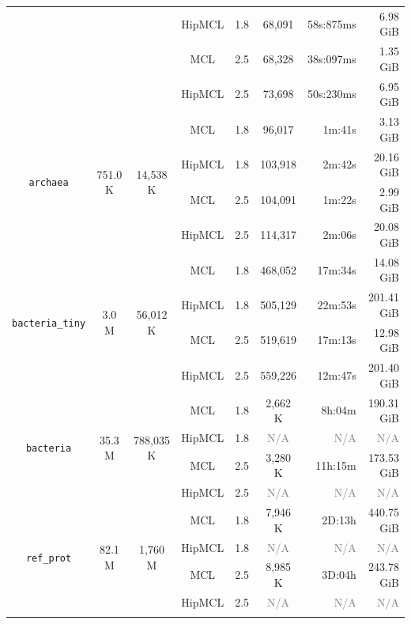 \begin{table}[htbp]
\begin{tabular}{ccccccrr}
    & & & HipMCL & 1.8 & 68,091 & 58s:875ms & 6.98 GiB \\
    & & & MCL    & 2.5 & 68,328 & 38s:097ms & 1.35 GiB \\
    & & & HipMCL & 2.5 & 73,698 & 50s:230ms & 6.95 GiB \\
    \midrule
    \multirow{4}{*}{\texttt{archaea}} & \multirow{4}{*}{751.0 K} & \multirow{4}{*}{14,538 K}
        & MCL    & 1.8 &  96,017 & 1m:41s &  3.13 GiB \\
    & & & HipMCL & 1.8 & 103,918 & 2m:42s & 20.16 GiB \\
    & & & MCL    & 2.5 & 104,091 & 1m:22s &  2.99 GiB \\
    & & & HipMCL & 2.5 & 114,317 & 2m:06s & 20.08 GiB \\
    \midrule
    \multirow{4}{*}{\texttt{bacteria\_tiny}} & \multirow{4}{*}{3.0 M} & \multirow{4}{*}{56,012 K}
        & MCL    & 1.8 & 468,052 & 17m:34s &  14.08 GiB \\
    & & & HipMCL & 1.8 & 505,129 & 22m:53s & 201.41 GiB \\
    & & & MCL    & 2.5 & 519,619 & 17m:13s &  12.98 GiB \\
    & & & HipMCL & 2.5 & 559,226 & 12m:47s & 201.40 GiB \\
    \midrule
    \multirow{4}{*}{\texttt{bacteria}} & \multirow{4}{*}{35.3 M} & \multirow{4}{*}{788,035 K}
        & MCL    & 1.8 & 2,662 K & 8h:04m & 190.31 GiB \\
    & & & HipMCL & 1.8 & \textcolor{gray}{N/A} & \textcolor{gray}{N/A} & \textcolor{gray}{N/A} \\
    & & & MCL    & 2.5 & 3,280 K & 11h:15m & 173.53 GiB \\
    & & & HipMCL & 2.5 & \textcolor{gray}{N/A} & \textcolor{gray}{N/A} & \textcolor{gray}{N/A} \\
    \midrule
    \multirow{4}{*}{\texttt{ref\_prot}} & \multirow{4}{*}{82.1 M} & \multirow{4}{*}{1,760 M}
        & MCL    & 1.8 & 7,946 K & 2D:13h & 440.75 GiB \\
    & & & HipMCL & 1.8 & \textcolor{gray}{N/A} & \textcolor{gray}{N/A} & \textcolor{gray}{N/A} \\
    & & & MCL    & 2.5 & 8,985 K & 3D:04h & 243.78 GiB \\
    & & & HipMCL & 2.5 & \textcolor{gray}{N/A} & \textcolor{gray}{N/A} & \textcolor{gray}{N/A} \\
    \arrayrulecolor{black}
    \bottomrule
  \end{tabular}
  \label{tab:experimentsPalladium}
\end{table}

